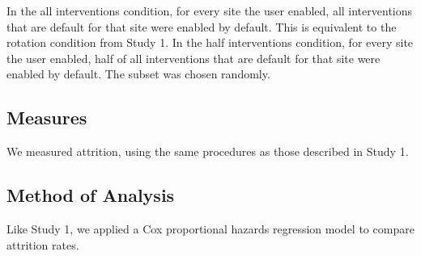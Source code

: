 In the all interventions condition, for every site the user enabled, all interventions that are default for that site were enabled by default. This is equivalent to the rotation condition from Study 1. In the half interventions condition, for every site the user enabled, half of all interventions that are default for that site were enabled by default. The subset was chosen randomly.

\subsection{Measures}

We measured attrition, using the same procedures as those described in Study 1.

\subsection{Method of Analysis}

Like Study 1, we applied a Cox proportional hazards regression model to compare attrition rates.

